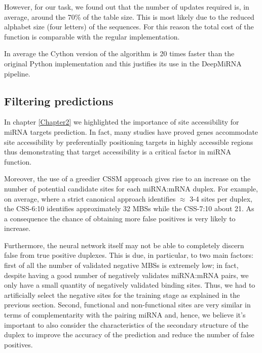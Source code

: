 However, for our task, we found out that the number of updates required is, in average, around the 70\% of the table size. This is most likely due to the reduced alphabet size (four letters) of the sequences. For this reason the total cost of the function is comparable with the regular implementation.

In average the Cython version of the algorithm is 20 times faster than the original Python implementation and this justifies its use in the DeepMiRNA pipeline.

      

\subsection{Filtering predictions}
In chapter \ref{Chapter2} we highlighted the importance of site accessibility for miRNA targets prediction. In fact, many studies \cite{helwak} \cite{common_features} have proved genes accommodate site accessibility by preferentially positioning targets in highly accessible regions \cite{accessibility_nrg_role} thus demonstrating that target accessibility is a critical factor in miRNA function.

Moreover, the use of a greedier CSSM approach gives rise to an increase on the number of potential candidate sites for each miRNA:mRNA duplex. For example, on average, where a strict canonical approach identifies $\approx$ 3-4 sites per duplex, the CSS-6:10 identifies approximately 32 MBSs while the CSS-7:10 about 21. As a consequence the chance of obtaining more false positives is very likely to increase.  

Furthermore, the neural network itself may not be able to completely discern false from true positive duplexes. This is due, in particular, to two main factors: first of all the number of validated negative MBSs is extremely low; in fact, despite having  a good number of negatively validates miRNA:mRNA pairs, we only have a small quantity of negatively validated binding sites. Thus, we had to artificially select the negative sites for the training stage as explained in the previous section. Second, functional and non-functional sites are very similar in terms of complementarity with the pairing miRNA and, hence, we believe it's important to also consider the characteristics of the secondary structure of the duplex to improve the accuracy of the prediction and reduce the number of false positives.

